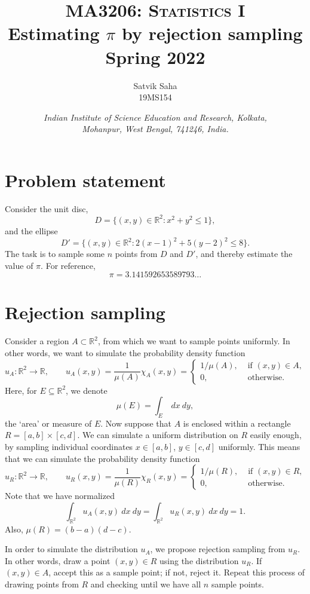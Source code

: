 \documentclass[10pt]{article}
\title{
    \Large\textsc{MA3206: Statistics I} \\
    \Huge \textbf{Estimating $\pi$ by rejection sampling} \\
    \vspace{5pt}
    \Large{Spring 2022}
}
\author{
    \large Satvik Saha
    \\\textsc{\small 19MS154}
}
\date{\normalsize
    \textit{Indian Institute of Science Education and Research, Kolkata, \\
    Mohanpur, West Bengal, 741246, India.} \\
}
\newcommand{\R}{\mathbb{R}}
\begin{document}
    \maketitle

    \tableofcontents

    \section{Problem statement}
    
    Consider the unit disc, \[
        D = \{(x, y) \in \R^2 : x^2 + y^2 \leq 1\},
    \] and the ellipse \[
        D' = \{(x, y) \in \R^2 : 2(x - 1)^2 + 5(y - 2)^2 \leq 8 \}.
    \] The task is to sample some $n$ points from $D$ and $D'$, and thereby estimate
    the value of $\pi$. For reference, \[
        \pi = 3.141592653589793 \dots
    \] 


    \section{Rejection sampling}

    Consider a region $A \subset \R^2$, from which we want to sample points
    uniformly. In other words, we want to simulate the probability density function
    \[
        u_A\colon \R^2 \to \R, \qquad u_A(x, y) = \frac{1}{\mu(A)}\chi_A(x, y) = \begin{cases}
            1 / \mu(A), &\text{ if } (x, y) \in A, \\
            0, &\text{ otherwise}.
        \end{cases}
    \] Here, for $E \subseteq \R^2$, we denote \[
        \mu(E) = \int_E\:dx\:dy,
    \] the `area' or measure of $E$. Now suppose that $A$ is enclosed within a
    rectangle $R = [a, b] \times [c, d]$. We can simulate a uniform distribution on
    $R$ easily enough, by sampling individual coordinates $x \in [a, b]$, $y \in [c,
    d]$ uniformly. This means that we can simulate the probability density function
    \[
        u_R\colon \R^2 \to \R, \qquad u_R(x, y) = \frac{1}{\mu(R)}\chi_R(x, y) = \begin{cases}
            1 / \mu(R), &\text{ if } (x, y) \in R, \\
            0, &\text{ otherwise}.
        \end{cases}
    \] Note that we have normalized \[
        \int_{\R^2} u_A(x, y)\:dx\:dy = \int_{\R^2} u_R(x, y)\:dx\:dy = 1.
    \] Also, $\mu(R) = (b - a)(d - c)$.

    In order to simulate the distribution $u_A$, we propose rejection sampling
    from $u_R$. In other words, draw a point $(x, y) \in R$ using the distribution
    $u_R$. If $(x, y) \in A$, accept this as a sample point; if not, reject it.
    Repeat this process of drawing points from $R$ and checking until we have all $n$
    sample points.
\end{document}
